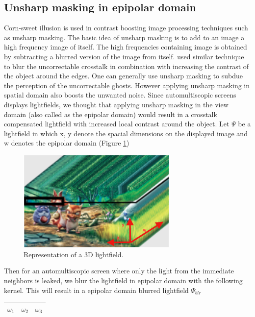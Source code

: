 \subsection{Unsharp masking in epipolar domain}
Corn-sweet illusion \cite{ wiki:cornsweet} is used in contrast boosting image processing techniques such as unsharp masking. The basic idea of unsharp masking is to add to an image a high frequency image of itself. The high frequencies containing image is obtained by subtracting a blurred version of the image from itself. \cite{van2011perceptually} used similar technique to blur the uncorrectable crosstalk in combination with increasing the contrast of the object around the edges. One can generally use unsharp masking to subdue the perception of the uncorrectable ghosts. However applying unsharp masking in spatial domain also boosts the unwanted noise. Since automultiscopic screens displays lightfields, we thought that applying unsharp masking in the view domain (also called as the epipolar domain) would result in a crosstalk compensated lightfield with increased local contrast around the object. Let $\Psi$ be a lightfield in which x, y denote the spacial dimensions on the displayed image and w denotes the epipolar domain (Figure \ref{fig:lightfeild})
\begin{figure}[htbp]
\centering
    \includegraphics[width=0.7\textwidth]{./Template_Figures/lightfield}
    \caption{Representation of a 3D lightfield.\label{fig:lightfeild}}
\end{figure}
Then for an automultiscopic screen where only the light from the immediate neighbors is leaked, we blur the lightfield in epipolar domain with the following kernel. This will result in a epipolar domain blurred lightfield $\Psi_{blr}$
\begin{table}[htbp]
\centering
\begin{tabular}{|c|c|c|}
\hline
$\omega_1$ & $\omega_2$ & $\omega_3$ \\
\hline
\end{tabular}
\label{tab:blurring_kernel}
\end{table}

